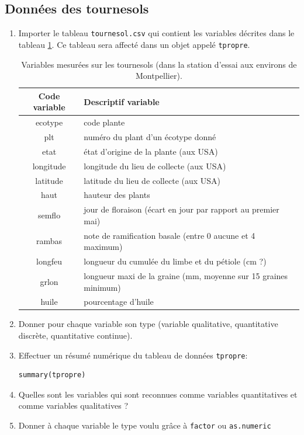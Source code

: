\documentclass[a4paper,10pt,french]{article}
\begin{document}
\subsection{Données des tournesols}
\begin{enumerate}
\item Importer le tableau \texttt{tournesol.csv} qui contient les variables décrites dans le tableau \ref{tab:variables:plantes}.  Ce tableau sera affecté dans un objet appelé \texttt{tpropre}.
\begin{table}[H]
  \centering
  \begin{tabular}{cl}\hline\hline
Code variable& Descriptif variable\\\hline
    ecotype & code plante \\
plt & numéro du plant d'un écotype donné\\
etat & état d'origine de la plante (aux USA)\\
longitude& longitude du lieu de collecte (aux USA)\\
latitude& latitude du lieu de collecte (aux USA)\\
haut& hauteur des plants\\
semflo& jour de floraison (écart en jour par rapport au premier mai)\\
rambas&note de ramification basale (entre 0 aucune et 4 maximum)\\
longfeu&longueur du cumulée du limbe et du pétiole (cm ?)\\ 
grlon&longueur maxi de la graine (mm, moyenne sur 15 graines minimum)\\
huile&pourcentage d'huile\\\hline
  \end{tabular}
  \caption{Variables mesurées sur les tournesols (dans la station d'essai aux environs de Montpellier).}
  \label{tab:variables:plantes}
\end{table}
\item Donner pour chaque variable son type (variable qualitative,
  quantitative discrète, quantitative continue).
\item Effectuer un résumé numérique du tableau de données \texttt{tpropre}:
\begin{verbatim}
summary(tpropre)
\end{verbatim}
\item Quelles sont les variables qui sont reconnues comme variables quantitatives et comme variables qualitatives ?
\item Donner à chaque variable le type voulu grâce à \texttt{factor} ou \texttt{as.numeric}
\end{enumerate}
\end{document}
